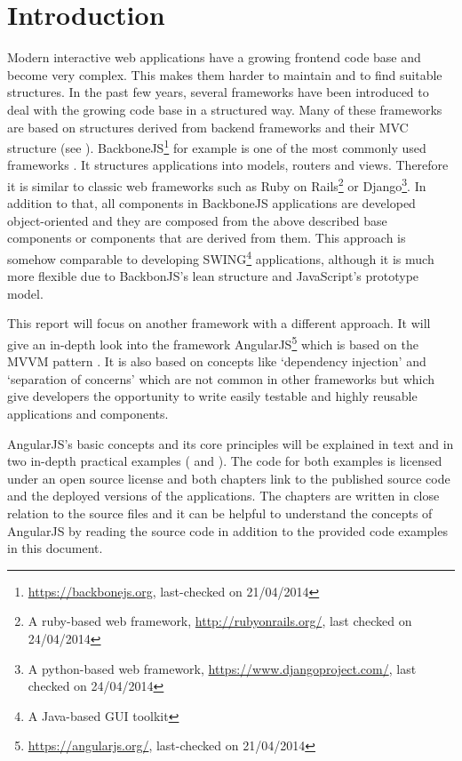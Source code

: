 \chapter{Introduction}
\label{ch:introduction}

Modern interactive web applications have a growing frontend code base and become very complex. This makes them harder to maintain and to find suitable structures. In the past few years, several frameworks have been introduced to deal with the growing code base in a structured way. Many of these frameworks are based on structures derived from backend frameworks and their MVC structure (see ). BackboneJS\footnote{\url{https://backbonejs.org}, last-checked on 21/04/2014} for example is one of the most commonly used frameworks \cite{sanderson2012rich}. It structures applications into models, routers and views. Therefore it is similar to classic web frameworks such as Ruby on Rails\footnote{A ruby-based web framework, \url{http://rubyonrails.org/}, last checked on 24/04/2014} or Django\footnote{A python-based web framework, \url{https://www.djangoproject.com/}, last checked on 24/04/2014}. In addition to that, all components in BackboneJS applications are developed object-oriented and they are composed from the above described base components or components that are derived from them. This approach is somehow comparable to developing SWING\footnote{A Java-based GUI toolkit} applications, although it is much more flexible due to BackbonJS's lean structure and JavaScript's prototype model.

This report will focus on another framework with a different approach. It will give an in-depth look into the framework AngularJS\footnote{\url{https://angularjs.org/}, last-checked on 21/04/2014} which is based on the MVVM pattern \cite{minar2012mvvm}. It is also based on concepts like `dependency injection' and `separation of concerns' which are not common in other frameworks but which give developers the opportunity to write easily testable and highly reusable applications and components.

AngularJS's basic concepts and its core principles will be explained in text and in two in-depth practical examples ( and ). The code for both examples is licensed under an open source license and both chapters link to the published source code and the deployed versions of the applications. The chapters are written in close relation to the source files and it can be helpful to understand the concepts of AngularJS by reading the source code in addition to the provided code examples in this document. 

